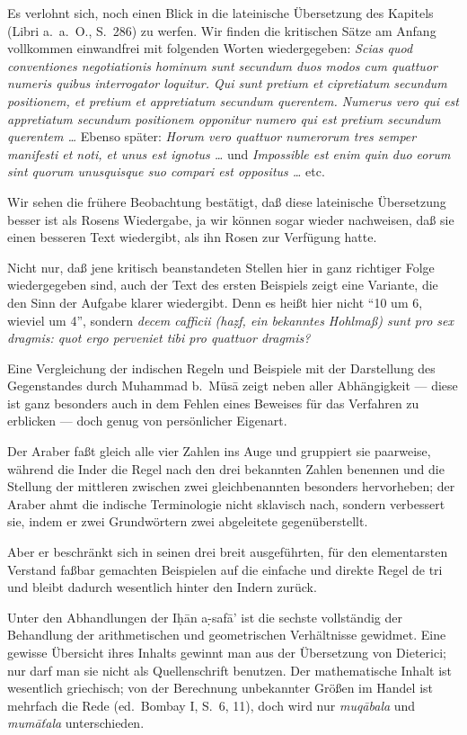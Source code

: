 \documentclass[11pt,a4paper]{article}
\newcommand{\s}[1]{\d{#1}}     %
\newcommand{\hw}{\d{h}}       %
\newcommand{\enquote}[1]{``#1''}
\begin{document}
Es verlohnt sich, noch einen Blick in die lateinische \"Ubersetzung des Kapitels (Libri a.\ a.\ O., S.\ 286) zu werfen. Wir finden die kritischen S\"atze am Anfang vollkommen einwandfrei mit folgenden Worten wiedergegeben: \textit{Scias quod conventiones negotiationis hominum sunt secundum duos modos cum quattuor numeris quibus interrogator loquitur. Qui sunt pretium et cipretiatum secundum positionem, et pretium et appretiatum secundum querentem. Numerus vero qui est appretiatum secundum positionem opponitur numero qui est pretium secundum querentem \ldots{}} Ebenso sp\"ater: \textit{Horum vero quattuor numerorum tres semper manifesti et noti, et unus est ignotus \ldots{}} und \textit{Impossible est enim quin duo eorum sint quorum unusquisque suo compari est oppositus \ldots{}} etc.

Wir sehen die fr\"uhere Beobachtung best\"atigt, da\ss{} diese lateinische \"Ubersetzung besser ist als Rosens Wiedergabe, ja wir k\"onnen sogar wieder nachweisen, da\ss{} sie einen besseren Text wiedergibt, als ihn Rosen zur Verf\"ugung hatte.

Nicht nur, da\ss{} jene kritisch beanstandeten Stellen hier in ganz richtiger Folge wiedergegeben sind, auch der Text des ersten Beispiels zeigt eine Variante, die den Sinn der Aufgabe klarer wiedergibt. Denn es hei\ss{}t hier nicht \enquote{10 um 6, wieviel um 4}, sondern \textit{decem cafficii (ha\d{z}f, ein bekanntes Hohlma\ss{}) sunt pro sex dragmis: quot ergo perveniet tibi pro quattuor dragmis?}

Eine Vergleichung der indischen Regeln und Beispiele mit der Darstellung des Gegenstandes durch Muhammad b.\ M\"us\=a zeigt neben aller Abh\"angigkeit --- diese ist ganz besonders auch in dem Fehlen eines Beweises f\"ur das Verfahren zu erblicken --- doch genug von pers\"onlicher Eigenart.

Der Araber fa\ss{}t gleich alle vier Zahlen ins Auge und gruppiert sie paarweise, w\"ahrend die Inder die Regel nach den drei bekannten Zahlen benennen und die Stellung der mittleren zwischen zwei gleichbenannten besonders hervorheben; der Araber ahmt die indische Terminologie nicht sklavisch nach, sondern verbessert sie, indem er zwei Grundw\"ortern zwei abgeleitete gegen\"uberstellt.

Aber er beschr\"ankt sich in seinen drei breit ausgef\"uhrten, f\"ur den elementarsten Verstand fa\ss{}bar gemachten Beispielen auf die einfache und direkte Regel de tri und bleibt dadurch wesentlich hinter den Indern zur\"uck.

Unter den Abhandlungen der I\hw{}\=an a\s-s{}af\=a' ist die sechste vollst\"andig der Behandlung der arithmetischen und geometrischen Verh\"altnisse gewidmet. Eine gewisse \"Ubersicht ihres Inhalts gewinnt man aus der \"Ubersetzung von Dieterici; nur darf man sie nicht als Quellenschrift benutzen. Der mathematische Inhalt ist wesentlich griechisch; von der Berechnung unbekannter Gr\"o\ss{}en im Handel ist mehrfach die Rede (ed.\ Bombay I, S.\ 6, 11), doch wird nur \textit{muq\=abala} und \textit{mum\=a\v{t}ala} unterschieden.
\end{document}
